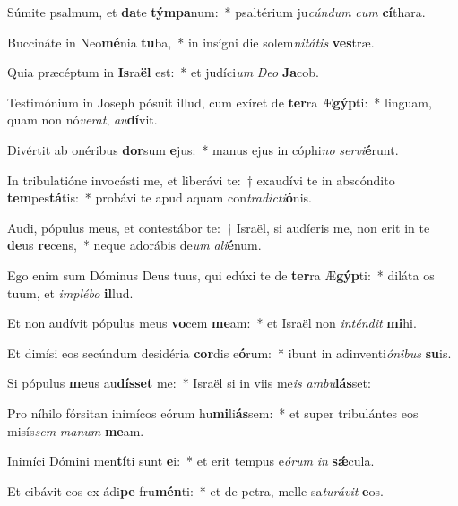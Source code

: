 \item Súmite psalmum, et \textbf{da}te \textbf{tým}\textbf{pa}num:~* psaltérium ju\textit{cún}\textit{dum} \textit{cum} \textbf{cí}thara.
\item Buccináte in Neo\textbf{mé}nia \textbf{tu}ba,~* in insígni die solem\textit{ni}\textit{tá}\textit{tis} \textbf{ves}træ.
\item Quia præcéptum in \textbf{Is}ra\textbf{ël} est:~* et judíci\textit{um} \textit{De}\textit{o} \textbf{Ja}cob.
\item Testimónium in Joseph pósuit illud, cum exíret de \textbf{ter}ra Æ\textbf{gýp}ti:~* linguam, quam non nó\textit{ve}\textit{rat}, \textit{au}\textbf{dí}vit.
\item Divértit ab onéribus \textbf{dor}sum \textbf{e}jus:~* manus ejus in cóphi\textit{no} \textit{ser}\textit{vi}\textbf{é}runt.
\item In tribulatióne invocásti me, et liberávi te:~† exaudívi te in abscóndito \textbf{tem}pes\textbf{tá}tis:~* probávi te apud aquam con\textit{tra}\textit{dic}\textit{ti}\textbf{ó}nis.
\item Audi, pópulus meus, et contestábor te:~† Israël, si audíeris me, non erit in te \textbf{de}us \textbf{re}cens,~* neque adorábis de\textit{um} \textit{a}\textit{li}\textbf{é}num.
\item Ego enim sum Dóminus Deus tuus, qui edúxi te de \textbf{ter}ra Æ\textbf{gýp}ti:~* diláta os tuum, et \textit{im}\textit{plé}\textit{bo} \textbf{il}lud.
\item Et non audívit pópulus meus \textbf{vo}cem \textbf{me}am:~* et Israël non \textit{in}\textit{tén}\textit{dit} \textbf{mi}hi.
\item Et dimísi eos secúndum desidéria \textbf{cor}dis e\textbf{ó}rum:~* ibunt in adinventi\textit{ó}\textit{ni}\textit{bus} \textbf{su}is.
\item Si pópulus \textbf{me}us au\textbf{dís}\textbf{set} me:~* Israël si in viis me\textit{is} \textit{am}\textit{bu}\textbf{lás}set:
\item Pro níhilo fórsitan inimícos eórum hu\textbf{mi}li\textbf{ás}sem:~* et super tribulántes eos misís\textit{sem} \textit{ma}\textit{num} \textbf{me}am.
\item Inimíci Dómini men\textbf{tí}ti sunt \textbf{e}i:~* et erit tempus e\textit{ó}\textit{rum} \textit{in} \textbf{sǽ}cula.
\item Et cibávit eos ex ádi\textbf{pe} fru\textbf{mén}ti:~* et de petra, melle sa\textit{tu}\textit{rá}\textit{vit} \textbf{e}os.

